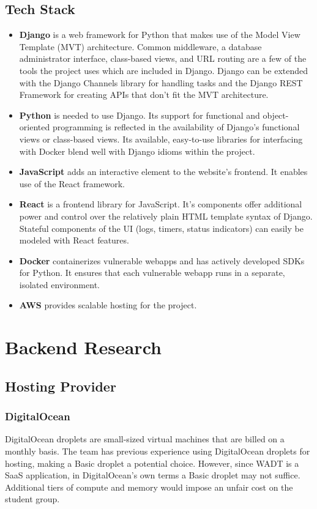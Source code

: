 \documentclass[12pt,titlepage]{article}
\begin{document}
\subsection{Tech Stack}
\begin{itemize}
	\item \textbf{Django} is a web framework for Python that makes use of the Model View Template (MVT) architecture. Common middleware, a database administrator interface, class-based views, and URL routing are a few of the tools the project uses which are included in Django. Django can be extended with the Django Channels library for handling tasks and the Django REST Framework for creating APIs that don't fit the MVT architecture.
	\item \textbf{Python} is needed to use Django. Its support for functional and object-oriented programming is reflected in the availability of Django's functional views or class-based views. Its available, easy-to-use libraries for interfacing with Docker blend well with Django idioms within the project.
	\item \textbf{JavaScript} adds an interactive element to the website's frontend. It enables use of the React framework.
	\item \textbf{React} is a frontend library for JavaScript. It's components offer additional power and control over the relatively plain HTML template syntax of Django. Stateful components of the UI (logs, timers, status indicators) can easily be modeled with React features.
	\item \textbf{Docker} containerizes vulnerable webapps and has actively developed SDKs for Python. It ensures that each vulnerable webapp runs in a separate, isolated environment.
	\item \textbf{AWS} provides scalable hosting for the project.
\end{itemize}

\section{Backend Research}

\subsection{Hosting Provider}
\subsubsection{DigitalOcean}
DigitalOcean droplets are small-sized virtual machines that are billed on a monthly basis.
The team has previous experience using DigitalOcean droplets for hosting, making a Basic droplet a potential choice. However, since WADT is a SaaS application, in DigitalOcean's own terms a Basic droplet may not suffice. Additional tiers of compute and memory would impose an unfair cost on the student group.
\end{document}
